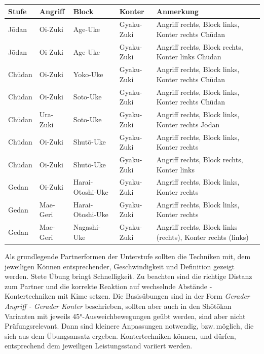 \documentclass[a5paper,landscape,DIV=calc,11pt,notitlepage]{scrartcl}
\begin{document}
\begin{tcolorbox}[colback=white,colframe=GKD,coltitle=white,adjusted title=Kihon-Ippon-Kumite]
	\null\vfill\null
	{\small 	
		\begin{tabularx}{\textwidth}{llllX}
			\textbf{Stufe} 	& \textbf{Angriff} 	& \textbf{Block}&\textbf{Konter}&Anmerkung\\
			\midrule
			J\={o}dan 	& Oi-Zuki 	& Age-Uke			&Gyaku-Zuki	& Angriff rechts, Block links, Konter rechts Ch\={u}dan \\
			J\={o}dan 	& Oi-Zuki 	& Age-Uke			&Gyaku-Zuki	& Angriff rechts, Block rechts, Konter links Ch\={u}dan \\	
			Ch\={u}dan	& Oi-Zuki	& Yoko-Uke			&Gyaku-Zuki	& Angriff rechts, Block links, Konter rechts Ch\={u}dan \\
			Ch\={u}dan	& Oi-Zuki	& Soto-Uke			&Gyaku-Zuki	& Angriff rechts, Block links, Konter rechts Ch\={u}dan \\
			Ch\={u}dan	& Ura-Zuki	& Soto-Uke			&Gyaku-Zuki	& Angriff rechts, Block links, Konter rechts J\={o}dan \\
			Ch\={u}dan	& Oi-Zuki	& Shut\={o}-Uke		&Gyaku-Zuki	& Angriff rechts, Block links, Konter rechts \\
			Ch\={u}dan	& Oi-Zuki	& Shut\={o}-Uke		&Gyaku-Zuki	& Angriff rechts, Block rechts, Konter links \\
			Gedan		& Oi-Zuki	& Harai-Otoshi-Uke	&Gyaku-Zuki	& Angriff rechts, Block links, Konter rechts  \\
			Gedan		& Mae-Geri	& Harai-Otoshi-Uke	&Gyaku-Zuki	& Angriff rechts, Block links, Konter rechts \\
			Gedan		& Mae-Geri	& Nagashi-Uke		&Gyaku-Zuki	& Angriff rechts, Block links (rechts), Konter rechts (links)\\
			\midrule
		\end{tabularx}
	}\null\vfill\null
	\begin{minipage}[t]{\textwidth}
		{\footnotesize 
			Als grundlegende Partnerformen der Unterstufe sollten die Techniken mit, dem jeweiligen Können entsprechender, Geschwindigkeit und Definition gezeigt werden. Stete Übung bringt Schnelligkeit. Zu beachten sind die richtige Distanz zum Partner und die korrekte Reaktion auf wechselnde Abstände - Kontertechniken mit Kime setzen. Die Basisübungen sind in der Form \textit{Gerader Angriff - Gerader Konter} beschrieben, sollten aber auch in den Sh\={o}t\={o}kan Varianten mit jeweils 45°-Ausweichbewegungen geübt werden, sind aber nicht Prüfungsrelevant. Dann sind kleinere Anpassungen notwendig, bzw.\,möglich, die sich aus dem Übungsansatz ergeben. Kontertechniken können, und dürfen, entsprechend dem jeweiligen Leistungsstand variiert werden.
}
\end{minipage}
\end{tcolorbox}
\end{document}
